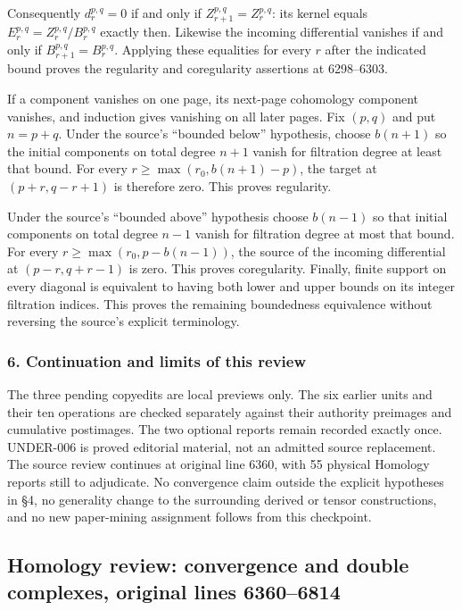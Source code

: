 \documentclass[11pt]{article}
\begin{document}
Consequently \(d_r^{p,q}=0\) if and only if \(Z_{r+1}^{p,q}=Z_r^{p,q}\): its kernel equals \(E_r^{p,q}=Z_r^{p,q}/B_r^{p,q}\) exactly then. Likewise the incoming differential vanishes if and only if \(B_{r+1}^{p,q}=B_r^{p,q}\). Applying these equalities for every \(r\) after the indicated bound proves the regularity and coregularity assertions at 6298--6303.

If a component vanishes on one page, its next-page cohomology component vanishes, and induction gives vanishing on all later pages. Fix \((p,q)\) and put \(n=p+q\). Under the source's ``bounded below'' hypothesis, choose \(b(n+1)\) so the initial components on total degree \(n+1\) vanish for filtration degree at least that bound. For every \(r\geq\max(r_0,b(n+1)-p)\), the target at \((p+r,q-r+1)\) is therefore zero. This proves regularity.

Under the source's ``bounded above'' hypothesis choose \(b(n-1)\) so that initial components on total degree \(n-1\) vanish for filtration degree at most that bound. For every \(r\geq\max(r_0,p-b(n-1))\), the source of the incoming differential at \((p-r,q+r-1)\) is zero. This proves coregularity. Finally, finite support on every diagonal is equivalent to having both lower and upper bounds on its integer filtration indices. This proves the remaining boundedness equivalence without reversing the source's explicit terminology.

\subsubsection{6. Continuation and limits of this review}\label{continuation-and-limits-of-this-review}

The three pending copyedits are local previews only. The six earlier units and their ten operations are checked separately against their authority preimages and cumulative postimages. The two optional reports remain recorded exactly once. UNDER-006 is proved editorial material, not an admitted source replacement. The source review continues at original line 6360, with 55 physical Homology reports still to adjudicate. No convergence claim outside the explicit hypotheses in §4, no generality change to the surrounding derived or tensor constructions, and no new paper-mining assignment follows from this checkpoint.
\clearpage
\subsection{Homology review: convergence and double complexes, original lines 6360--6814}\label{homology-review-convergence-and-double-complexes-original-lines-63606814}
\end{document}
